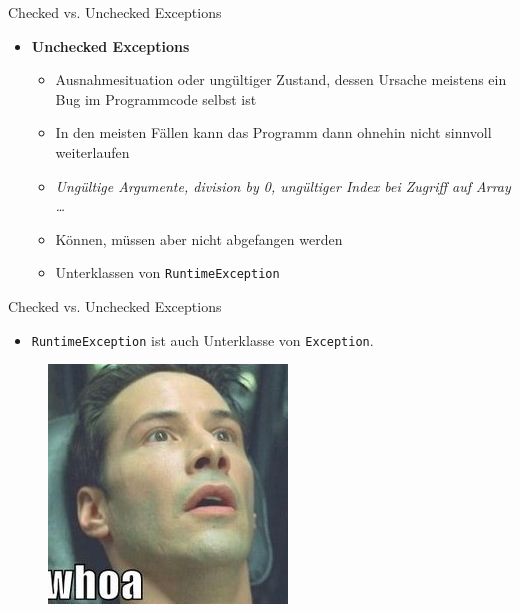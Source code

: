 \documentclass[18pt]{beamer}
\begin{document}
\begin{frame}{Checked vs. Unchecked Exceptions}

    \begin{itemize}
        \item \textbf{Unchecked Exceptions}
        \begin{itemize}
            \item Ausnahmesituation oder ungültiger Zustand, dessen Ursache meistens ein Bug im Programmcode selbst ist
            \item In den meisten Fällen kann das Programm dann ohnehin nicht sinnvoll weiterlaufen
            \item \textit{Ungültige Argumente, division by 0, ungültiger Index bei Zugriff auf Array \dots}
            \item Können, müssen aber nicht abgefangen werden
            \item Unterklassen von \texttt{RuntimeException}
        \end{itemize}
    \end{itemize}

\end{frame}


\begin{frame}{Checked vs. Unchecked Exceptions}

    \begin{itemize}
        \item \texttt{RuntimeException} ist auch Unterklasse von \texttt{Exception}.
    \end{itemize}


    \vspace{.2in}

    \begin{figure}
        \includegraphics[scale=.5]{img/whoa.jpg}
    \end{figure}

\end{frame}
\end{document}
